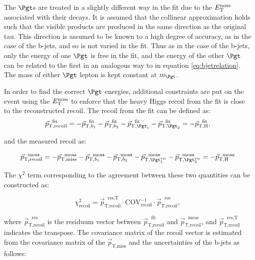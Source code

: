 The $\Pgt$s are treated in a slightly different way in the fit due to the $E_{\mathrm{T}}^{\text{miss}}$
associated with their decays. It is assumed that the collinear approximation
holds such that the visible products are produced in the same direction as the
original tau. This direction is assumed to be known to a high degree of
accuracy, as in the case of the b-jets, and so is not varied in the fit. Thus as
in the case of the b-jets, only the energy of one $\Pgt$ is free in the fit, and
the energy of the other $\Pgt$ can be related to the first in an analogous way
to in equation \ref{eq:bjetrelation}. The mass of either $\Pgt$ lepton is kept
constant at $m_{\Pgt}$.  

In order to find the correct $\Pgt$ energies, additional constraints are put on
the event using the $E_{\mathrm{T}}^{\text{miss}}$ to enforce that the heavy Higgs recoil from the fit
is close to the reconstructed recoil. The recoil from the fit can be defined as:
\begin{equation}
\vec{p}_{\text{T},\text{recoil}}^{\text{~~fit}} = -
\vec{p}_{\text{T},b_{1}}^{\text{~~fit}} -
\vec{p}_{\text{T},b_{2}}^{\text{~~fit}} -
\vec{p}_{\text{T},\Pgt_{1}}^{\text{~~fit}} - \vec{p}_{\text{T},\Pgt_{2}}^{\text{~~fit}} = -
\vec{p}_{\text{T},\text{H}}^{\text{~~fit}} ,
\end{equation}

and the measured recoil as:

\begin{equation}
\vec{p}_{\text{T},\text{recoil}}^{\text{~~meas}} = -
\vec{p}_{\text{T},\text{miss}}^{\text{~~meas}} -
\vec{p}_{\text{T},b_{1}}^{\text{~~meas}} - \vec{p}_{\text{T},b_{2}}^{\text{~~meas}} -
\vec{p}_{\text{T},\Pgt_{1}^{\text{vis}}}^{\text{~~meas}} -
\vec{p}_{\text{T},\Pgt_{2}^{\text{vis}}}^{\text{~~meas}} = -
\vec{p}_{\text{T},\text{H}}^{\text{~~meas}}
\end{equation}

The $\chi^{2}$ term corresponding to the agreement between these two quantities
can be constructed as:

\begin{equation}
\chi_{\text{recoil}}^{2} = \vec{p}_{\text{T},\text{recoil}}^{\text{~~res},\text{T}} \cdot
\text{COV}_{\text{recoil}}^{-1} \cdot
\vec{p}_{\text{T},\text{recoil}}^{\text{~~res}} ,  
\end{equation}

where $\vec{p}_{\text{T},\text{recoil}}^{\text{~~res}}$ is the residuum vector between
$\vec{p}_{\text{T},\text{recoil}}^{\text{~~fit}}$
and $\vec{p}_{\text{T},\text{recoil}}^{\text{~~meas}}$, and
$\vec{p}_{\text{T},\text{recoil}}^{\text{~~res},\text{T}}$ indicates the
transpose. The covariance matrix of the recoil vector is estimated from
the covariance matrix of the $\vec{p}_{\text{T},\text{miss}}$ and the uncertainties of the b-jets as
follows:

